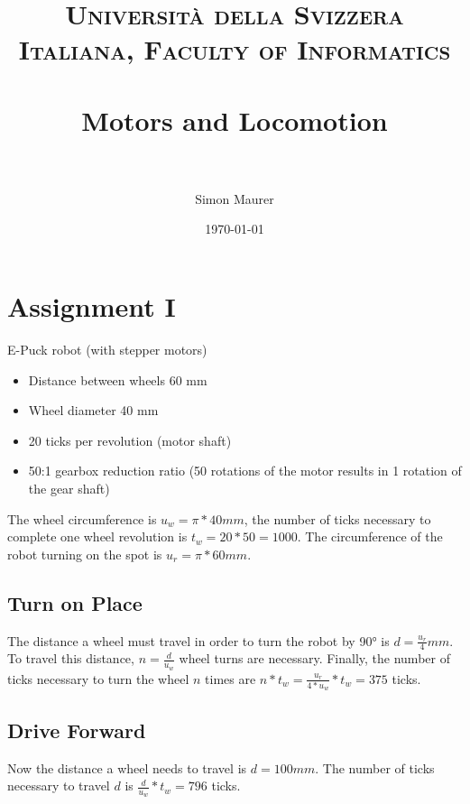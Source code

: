 \documentclass[paper=a4, fontsize=11pt]{scrartcl} %
\title{	
\normalfont \normalsize 
\textsc{Università della Svizzera Italiana, Faculty of Informatics} \\ [25pt] %
\horrule{0.5pt} \\[0.4cm] %
\huge Motors and Locomotion \\ %
\horrule{2pt} \\[0.5cm] %
}
\author{Simon Maurer} %
\date{\normalsize\today} %
\begin{document}
\maketitle %


\section{Assignment I}

E-Puck robot (with stepper motors)
\begin{itemize}
\item Distance between wheels 60 mm
\item Wheel diameter 40 mm
\item 20 ticks per revolution (motor shaft)
\item 50:1 gearbox reduction ratio (50 rotations of the motor results in 1 rotation of the gear shaft)
\end{itemize}

The wheel circumference is $ u_w = \pi * 40 mm $, the number of ticks necessary
to complete one wheel revolution is $ t_w = 20 * 50 = 1000 $. The circumference
of the robot turning on the spot is $ u_r = \pi * 60 mm $.

\subsection{Turn on Place}
The distance a wheel must travel in order to turn the robot by 90° is
$ d = \frac{u_r}{4} mm $. To travel this distance, $ n = \frac{d}{u_w} $ wheel
turns are necessary. Finally, the number of ticks necessary to turn the wheel
$ n $ times are $ n * t_w = \frac{u_r}{4 * u_w} * t_w = 375 $ ticks.



\subsection{Drive Forward}
Now the distance a wheel needs to travel is $ d = 100 mm $. The number of ticks
necessary to travel $ d $ is $ \frac{d}{u_w} * t_w = 796 $ ticks.

\end{document}

